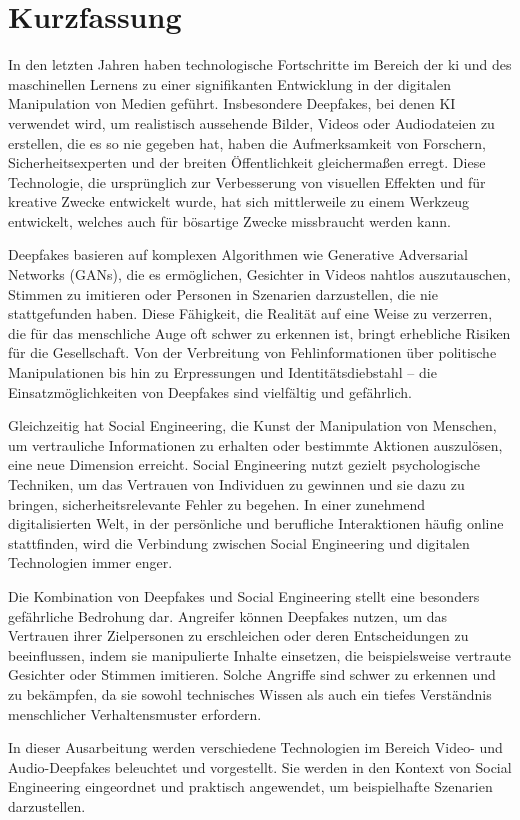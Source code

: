 \chapter{Kurzfassung}\label{ch:kurzfassung}

In den letzten Jahren haben technologische Fortschritte im Bereich der \gls{ki} und des maschinellen Lernens zu einer signifikanten Entwicklung in der digitalen Manipulation von Medien geführt.
Insbesondere Deepfakes, bei denen KI verwendet wird, um realistisch aussehende Bilder, Videos oder Audiodateien zu erstellen, die es so nie gegeben hat, haben die Aufmerksamkeit von Forschern, Sicherheitsexperten und der breiten Öffentlichkeit gleichermaßen erregt.
Diese Technologie, die ursprünglich zur Verbesserung von visuellen Effekten und für kreative Zwecke entwickelt wurde, hat sich mittlerweile zu einem Werkzeug entwickelt, welches auch für bösartige Zwecke missbraucht werden kann.

Deepfakes basieren auf komplexen Algorithmen wie Generative Adversarial Networks (GANs), die es ermöglichen, Gesichter in Videos nahtlos auszutauschen, Stimmen zu imitieren oder Personen in Szenarien darzustellen, die nie stattgefunden haben.
Diese Fähigkeit, die Realität auf eine Weise zu verzerren, die für das menschliche Auge oft schwer zu erkennen ist, bringt erhebliche Risiken für die Gesellschaft.
Von der Verbreitung von Fehlinformationen über politische Manipulationen bis hin zu Erpressungen und Identitätsdiebstahl – die Einsatzmöglichkeiten von Deepfakes sind vielfältig und gefährlich.

Gleichzeitig hat Social Engineering, die Kunst der Manipulation von Menschen, um vertrauliche Informationen zu erhalten oder bestimmte Aktionen auszulösen, eine neue Dimension erreicht.
Social Engineering nutzt gezielt psychologische Techniken, um das Vertrauen von Individuen zu gewinnen und sie dazu zu bringen, sicherheitsrelevante Fehler zu begehen.
In einer zunehmend digitalisierten Welt, in der persönliche und berufliche Interaktionen häufig online stattfinden, wird die Verbindung zwischen Social Engineering und digitalen Technologien immer enger.

Die Kombination von Deepfakes und Social Engineering stellt eine besonders gefährliche Bedrohung dar.
Angreifer können Deepfakes nutzen, um das Vertrauen ihrer Zielpersonen zu erschleichen oder deren Entscheidungen zu beeinflussen, indem sie manipulierte Inhalte einsetzen, die beispielsweise vertraute Gesichter oder Stimmen imitieren.
Solche Angriffe sind schwer zu erkennen und zu bekämpfen, da sie sowohl technisches Wissen als auch ein tiefes Verständnis menschlicher Verhaltensmuster erfordern.

In dieser Ausarbeitung werden verschiedene Technologien im Bereich Video- und Audio-Deepfakes beleuchtet und vorgestellt.
Sie werden in den Kontext von Social Engineering eingeordnet und praktisch angewendet, um beispielhafte Szenarien darzustellen.